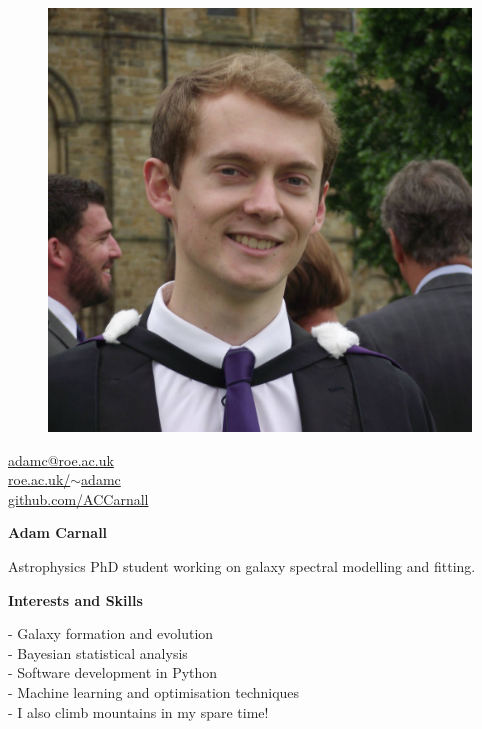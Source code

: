 \documentclass[a4paper,11pt,final]{memoir}
\newcommand{\Sep}{\vspace{1.5em}}
\newcommand{\SmallSep}{\vspace{0.5em}}
\newcommand{\CVSection}[1]
	{\Large\textbf{#1}\par
	\SmallSep\normalsize\normalfont}
\begin{document}
\begin{figure}
	\hfill
	\includegraphics[width=\columnwidth]{graduation.jpg}
	\vspace{-8cm}
\end{figure}

\begin{flushright}\small
	\href{mailto:adamc@roe.ac.uk}{adamc@roe.ac.uk}  \\
	\SmallSep
	\href{https://accarnall.github.io}{roe.ac.uk/$\sim$adamc} \\
	\SmallSep
	\href{https://www.github.com/ACCarnall}{github.com/ACCarnall} \\
\end{flushright}\normalsize
\framebreak


\Huge\bfseries {\color{RoyalBlue} Adam Carnall} \\
\normalsize\normalfont

Astrophysics PhD student working on galaxy spectral modelling and fitting.

\Sep

\CVSection{Interests and Skills}

 - Galaxy formation and evolution\\
 - Bayesian statistical analysis\\
 - Software development in Python\\
 - Machine learning and optimisation techniques\\
 - I also climb mountains in my spare time!
\end{document}
